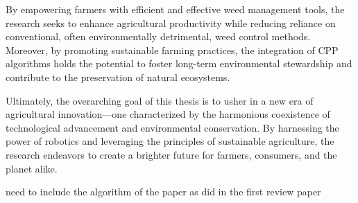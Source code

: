 \vspace*{6mm} 

By empowering farmers with efficient and effective weed management tools, the research seeks to enhance agricultural productivity while reducing reliance on conventional, often environmentally detrimental, weed control methods. Moreover, by promoting sustainable farming practices, the integration of CPP algorithms holds the potential to foster long-term environmental stewardship and contribute to the preservation of natural ecosystems.

\vspace*{6mm} 

Ultimately, the overarching goal of this thesis is to usher in a new era of agricultural innovation—one characterized by the harmonious coexistence of technological advancement and environmental conservation. By harnessing the power of robotics and leveraging the principles of sustainable agriculture, the research endeavors to create a brighter future for farmers, consumers, and the planet alike.

\vspace*{6mm} 

need to include the algorithm of the paper as did in the first review paper 
